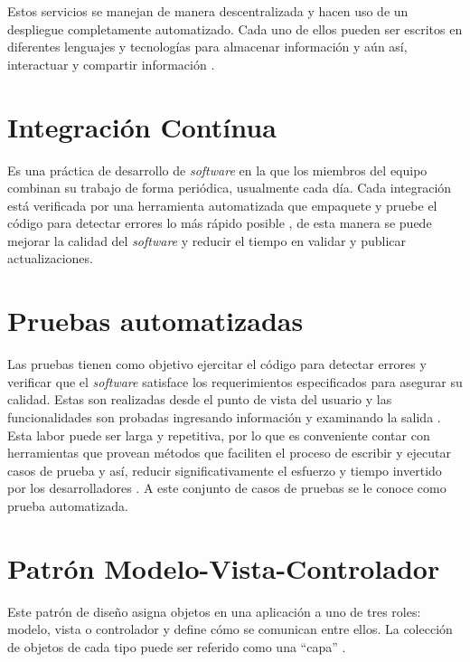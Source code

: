 Estos servicios se manejan de manera descentralizada y hacen uso de un despliegue completamente automatizado. Cada uno de ellos pueden ser escritos en diferentes lenguajes y tecnologías para almacenar información y aún así, interactuar y compartir información \cite{Microservices2}.

\section{Integración Contínua}

Es una práctica de desarrollo de \textit{software} en la que los miembros del equipo combinan su trabajo de forma periódica, usualmente cada día. Cada integración está verificada por una herramienta automatizada que empaquete y pruebe el código para detectar errores lo más rápido posible \cite{Integracion_Continua}, de esta manera se puede mejorar la calidad del \textit{software} y reducir el tiempo en validar y publicar actualizaciones.

\section{Pruebas automatizadas}

Las pruebas tienen como objetivo ejercitar el código para detectar errores y verificar que el \textit{software} satisface los requerimientos especificados para asegurar su calidad. Estas son realizadas desde el punto de vista del usuario y las funcionalidades son probadas ingresando información y examinando la salida \cite{Pruebas_Automatizadas}. \\

Esta labor puede ser larga y repetitiva, por lo que es conveniente contar con herramientas que provean métodos que faciliten el proceso de escribir y  ejecutar casos de prueba y así, reducir significativamente el esfuerzo y tiempo invertido por los desarrolladores \cite{Pruebas_Automatizadas}. A este conjunto de casos de pruebas se le conoce como prueba automatizada.

\section{Patrón Modelo-Vista-Controlador}

Este patrón de diseño asigna objetos en una aplicación a uno de tres roles: modelo, vista o controlador y define cómo se comunican entre ellos. La colección de objetos de cada tipo puede ser referido como una “capa” \cite{MVC}.


